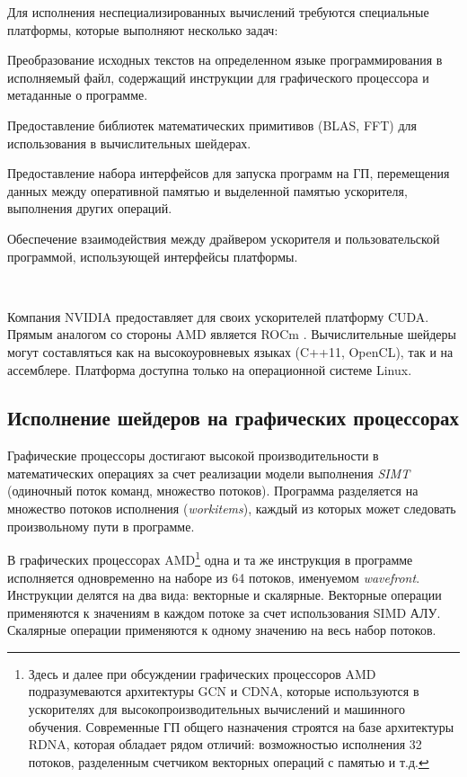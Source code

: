 \documentclass[a4paper,14pt]{extarticle}
\begin{document}
Для исполнения неспециализированных вычислений требуются специальные платформы,
которые выполняют несколько задач:
\begin{ul}
\item Преобразование исходных текстов на определенном языке программирования
  в исполняемый файл, содержащий инструкции для графического процессора и метаданные о программе.
\item Предоставление библиотек математических примитивов (BLAS, FFT)
  для использования в вычислительных шейдерах.
\item Предоставление набора интерфейсов для запуска программ на ГП, перемещения данных между
  оперативной памятью и выделенной памятью ускорителя, выполнения других операций.
\item Обеспечение взаимодействия между драйвером ускорителя и пользовательской программой,
  использующей интерфейсы платформы.
\end{ul}\ %

Компания NVIDIA предоставляет для своих ускорителей платформу CUDA. Прямым аналогом
со стороны AMD является ROCm \cite{rocm}. Вычислительные шейдеры могут составляться как
на высокоуровневых языках (C++11, OpenCL), так и на ассемблере. Платформа доступна
только на операционной системе Linux.

\subsection{Исполнение шейдеров на графических процессорах}

Графические процессоры достигают высокой производительности в математических операциях
за счет реализации модели выполнения \textit{SIMT} (одиночный поток команд, множество потоков).
Программа разделяется на множество потоков исполнения (\textit{workitems}),
каждый из которых может следовать произвольному пути в программе.

В графических процессорах AMD\footnote{Здесь и далее при обсуждении графических процессоров AMD
подразумеваются архитектуры GCN и CDNA, которые используются в ускорителях для высокопроизводительных
вычислений и машинного обучения. Современные ГП общего назначения строятся на базе архитектуры RDNA,
которая обладает рядом отличий: возможностью исполнения 32 потоков, разделенным счетчиком векторных
операций с памятью и т.д.}
одна и та же инструкция в программе исполняется одновременно на наборе из 64 потоков,
именуемом \textit{wavefront}. Инструкции делятся на два вида: векторные и скалярные.
Векторные операции применяются к значениям в каждом потоке за счет использования SIMD АЛУ.
Скалярные операции применяются к одному значению на весь набор потоков.
\end{document}

